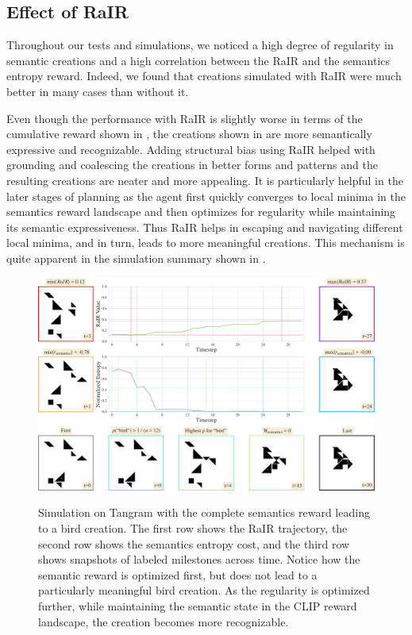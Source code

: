 \newpage
\subsection{Effect of RaIR}
\label{sec:effect-rair}

Throughout our tests and simulations, we noticed a high degree of regularity in semantic creations and a high correlation between the RaIR and the semantics entropy reward. 
Indeed, we found that creations simulated with RaIR were much better in many cases than without it.

Even though the performance with RaIR is slightly worse in terms of the cumulative reward shown in , the creations shown in  are more semantically expressive and recognizable.
Adding structural bias using RaIR helped with grounding and coalescing the creations in better forms and patterns and the resulting creations are neater and more appealing.
It is particularly helpful in the later stages of planning as the agent first quickly converges to local minima in the semantics reward landscape and then optimizes for regularity while maintaining its semantic expressiveness.
Thus RaIR helps in escaping and navigating different local minima, and in turn, leads to more meaningful creations.
This mechanism is quite apparent in the simulation summary shown in .

\begin{figure}[h]
    \centering
    \href{https://drive.google.com/file/d/1zhw-571KImEE4OPbpeWEA9SAKPv4r7F3}{\includegraphics[width=\textwidth]{images/sim_rair_later_bird_cropped.pdf}}
    \caption[Simulation on Tangram with the complete semantics reward leading to a bird creation.]{Simulation on Tangram with the complete semantics reward leading to a bird creation. The first row shows the RaIR trajectory, the second row shows the semantics entropy cost, and the third row shows snapshots of labeled milestones across time. Notice how the semantic reward is optimized first, but does not lead to a particularly meaningful bird creation. As the regularity is optimized further, while maintaining the semantic state in the CLIP reward landscape, the creation becomes more recognizable.}
    \label{fig:sim}
\end{figure}

